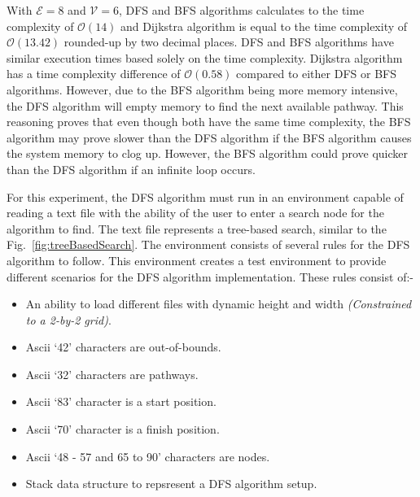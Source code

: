 \documentclass[conference]{IEEEtran}
\begin{document}
      With ${\mathcal{E} = 8}$ and $\mathcal{V} = 6$, DFS and BFS algorithms calculates to the time complexity of $\mathcal{O}(14)$ and Dijkstra algorithm is equal to the time complexity of $\mathcal{O}(13.42)$ rounded-up by two decimal places. DFS and BFS algorithms have similar execution times based solely on the time complexity. Dijkstra algorithm has a time complexity difference of $\mathcal{O}(0.58)$ compared to either DFS or BFS algorithms. However, due to the BFS algorithm being more memory intensive, the DFS algorithm will empty memory to find the next available pathway. This reasoning proves that even though both have the same time complexity, the BFS algorithm may prove slower than the DFS algorithm if the BFS algorithm causes the system memory to clog up. However, the BFS algorithm could prove quicker than the DFS algorithm if an infinite loop occurs.

      For this experiment, the DFS algorithm must run in an environment capable of reading a text file with the ability of the user to enter a search node for the algorithm to find. The text file represents a tree-based search, similar to the Fig.~\ref{fig:treeBasedSearch}. The environment consists of several rules for the DFS algorithm to follow. This environment creates a test environment to provide different scenarios for the DFS algorithm implementation. These rules consist of:-
      \begin{itemize}
        \item An ability to load different files with dynamic height and width \textit{(Constrained to a 2-by-2 grid)}.
        \item Ascii `42' characters are out-of-bounds.
        \item Ascii `32' characters are pathways.
        \item Ascii `83' character is a start position.
        \item Ascii `70' character is a finish position.
        \item Ascii `48 - 57 and 65 to 90' characters are nodes.
        \item Stack data structure to repsresent a DFS algorithm setup.
      \end{itemize}
\end{document}
